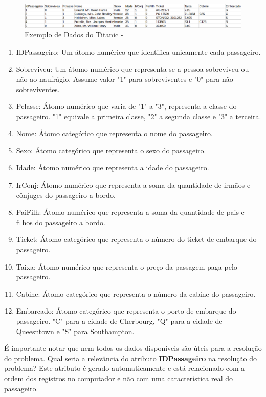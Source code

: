 \begin{figure}[!h]
\centering
\includegraphics[keepaspectratio=true,scale=0.40]
{figuras/dataEg.eps}
\caption{Exemplo de Dados do Titanic - \cite{titanic2012}}
\label{data_titatic}
\end{figure}
 

\begin{enumerate}
\item IDPassageiro: Um átomo numérico que identifica unicamente cada passageiro.
\item Sobreviveu: Um átomo numérico que representa se a pessoa sobreviveu ou não ao naufrágio. Assume valor "1" para sobreviventes e "0" para não sobreviventes.
\item Pclasse: Átomo numérico que varia de "1" a "3", representa a classe do passageiro. "1" equivale a primeira classe, "2" a segunda classe e "3" a terceira.
\item Nome: Átomo categórico que representa o nome do passageiro.
\item Sexo: Átomo categórico que representa o sexo do passageiro.
\item Idade: Átomo numérico que representa a idade do passageiro.
\item IrConj: Átomo numérico que representa a soma da quantidade de irmãos e cônjuges do passageiro a bordo.
\item PaiFilh: Átomo numérico que representa a soma da quantidade de pais e filhos do passageiro a bordo.
\item Ticket: Átomo categórico que representa o número do ticket de embarque do passageiro.
\item Taixa: Átomo numérico que representa o preço da passagem paga pelo passageiro.
\item Cabine: Átomo categórico que representa o número da cabine do passageiro.
\item Embarcado: Átomo categórico que representa o porto de embarque do passageiro. "C"  para a cidade de Cherbourg, "Q"  para a cidade de Queesntown e "S"  para Southampton.
\end{enumerate}


É importante notar que nem todos os dados disponíveis são úteis para a resolução do problema. Qual seria a relevância do atributo \textbf{IDPassageiro} na resolução do problema? Este atributo é gerado automaticamente e está relacionado com a ordem dos registros no computador e não com uma característica real do passageiro. 

